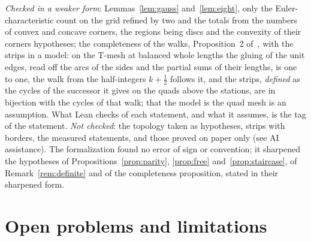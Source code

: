 \documentclass[11pt,a4paper]{article}
\begin{document}
\emph{Checked in a weaker form}: Lemmas~\ref{lem:gauss} and~\ref{lem:eight}, only the
Euler-characteristic count on the grid refined by two and the totals from the
numbers of convex and concave corners, the regions being discs and the
convexity of their corners hypotheses; the completeness of the walks,
Proposition~2 of~\cite{gardent2026loops}, with the strips in a model: on the
T-mesh at balanced whole lengths the gluing of the unit edges, read off the
arcs of the sides and the partial sums of their lengths, is one to one, the
walk from the half-integers $k + \frac12$ follows it, and the strips,
\emph{defined} as the cycles of the successor it gives on the quads above the
stations, are in bijection with the cycles of that walk; that the model is
the quad mesh is an assumption.
\else
What Lean checks of each statement, and what it assumes, is the tag of the
statement.
\fi
\emph{Not checked}: the topology taken as hypotheses, strips with borders, the
measured statements, and those proved on paper only (see AI assistance). The formalization found no error of sign or
convention; it sharpened the hypotheses of Propositions~\ref{prop:parity},
\ref{prop:free} and~\ref{prop:staircase}, of Remark~\ref{rem:definite} and of
the completeness proposition, stated in their sharpened form.

\section{Open problems and limitations}\label{sec:open}
\end{document}
